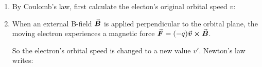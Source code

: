 \documentclass[class=article, crop=false, 12pt]{standalone}
\begin{document}
\begin{enumerate}
    \item By Coulomb's law, first calculate the electon's original orbital speed $v$:

    \item When an external B-field $\va*{B}$ is applied perpendicular to the orbital plane, 
    the moving electron experiences a magnetic force $\va*{F} = (-q)\va*{v}\cross\va*{B}$.


    So the electron's orbital speed is changed to a new value $v'$.
    Newton's law writes:
    
\end{enumerate}


\fi





\theend
\end{document}
